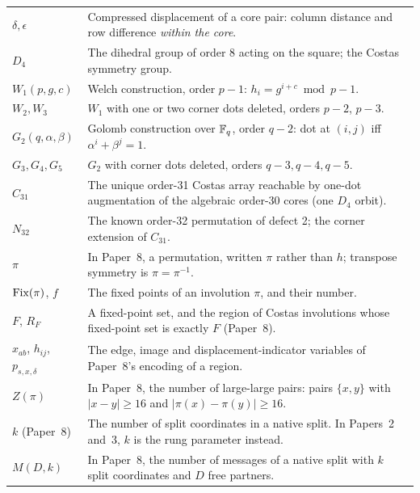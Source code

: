 \begin{longtable}{@{}l >{\raggedright\arraybackslash}p{}@{}}
$\delta,\epsilon$ & Compressed displacement of a core pair: column distance and
      row difference \emph{within the core}. \\
$D_4$ & The dihedral group of order 8 acting on the square; the Costas
      symmetry group. \\
$W_1(p,g,c)$ & Welch construction, order $p-1$: $h_i = g^{i+c}\bmod p - 1$. \\
$W_2,W_3$ & $W_1$ with one or two corner dots deleted, orders $p-2$, $p-3$. \\
$G_2(q,\alpha,\beta)$ & Golomb construction over $\mathbb{F}_q$, order $q-2$:
      dot at $(i,j)$ iff $\alpha^i+\beta^j=1$. \\
$G_3,G_4,G_5$ & $G_2$ with corner dots deleted, orders $q-3,q-4,q-5$. \\
$C_{31}$ & The unique order-31 Costas array reachable by one-dot augmentation
      of the algebraic order-30 cores (one $D_4$ orbit). \\
$N_{32}$ & The known order-32 permutation of defect 2; the corner extension of
      $C_{31}$. \\
$\pi$ & In Paper~8, a permutation, written $\pi$ rather than $h$; transpose symmetry is
      $\pi=\pi^{-1}$. \\
$\operatorname{Fix}(\pi)$, $f$ & The fixed points of an involution $\pi$, and their number. \\
$F$, $R_F$ & A fixed-point set, and the region of Costas involutions whose fixed-point set is
      exactly $F$ (Paper~8). \\
$x_{ab}$, $h_{ij}$, $p_{s,x,\delta}$ & The edge, image and displacement-indicator variables of
      Paper~8's encoding of a region. \\
$Z(\pi)$ & In Paper~8, the number of large-large pairs: pairs $\{x,y\}$ with $|x-y|\ge16$ and
      $|\pi(x)-\pi(y)|\ge16$. \\
$k$ (Paper~8) & The number of split coordinates in a native split. In Papers~2 and~3, $k$ is the
      rung parameter instead. \\
$M(D,k)$ & In Paper~8, the number of messages of a native split with $k$ split coordinates and $D$
      free partners. \\
\bottomrule
\end{longtable}

